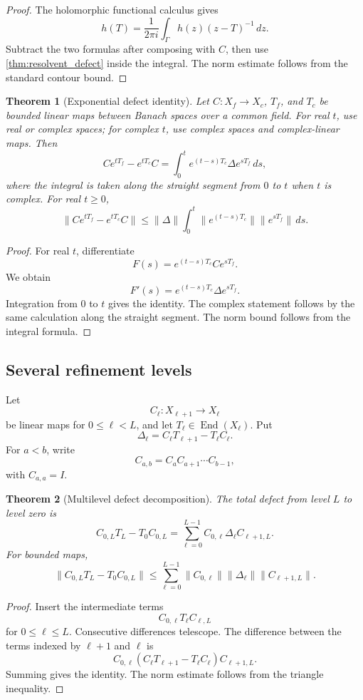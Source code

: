 \documentclass[11pt,a4paper]{article}
\newtheorem{theorem}{Theorem}[section]
\theoremstyle{definition}
\theoremstyle{remark}
\newcommand{\End}{\operatorname{End}}
\providecommand{\End}{\operatorname{End}}
\theoremstyle{definition}\newtheorem{construction}[theorem]{Construction}\newtheorem{certificate}[theorem]{Numerical Certificate}
\theoremstyle{remark}\newtheorem{boundary}[theorem]{Boundary}
\begin{document}
\begin{proof}
The holomorphic functional calculus gives
\[
h(T)
=
\frac{1}{2\pi i}
\int_\Gamma h(z)(z-T)^{-1}\,dz.
\]
Subtract the two formulas after composing with $C$, then use \cref{thm:resolvent_defect} inside the integral.  The norm estimate follows from the standard contour bound.
\end{proof}

\begin{theorem}[Exponential defect identity]\label{thm:exponential_defect}
Let $C:X_f\to X_c$, $T_f$, and $T_c$ be bounded linear maps between Banach spaces over a common field.  For real $t$, use real or complex spaces; for complex $t$, use complex spaces and complex-linear maps.  Then
\[
Ce^{tT_f}-e^{tT_c}C
=
\int_0^t e^{(t-s)T_c}\Delta e^{sT_f}\,ds,
\]
where the integral is taken along the straight segment from $0$ to $t$ when $t$ is complex.  For real $t\geq0$,
\[
\|Ce^{tT_f}-e^{tT_c}C\|
\leq
\|\Delta\|
\int_0^t
\|e^{(t-s)T_c}\|
\|e^{sT_f}\|\,ds.
\]
\end{theorem}

\begin{proof}
For real $t$, differentiate
\[
F(s)=e^{(t-s)T_c}Ce^{sT_f}.
\]
We obtain
\[
F'(s)=e^{(t-s)T_c}\Delta e^{sT_f}.
\]
Integration from $0$ to $t$ gives the identity.  The complex statement follows by the same calculation along the straight segment.  The norm bound follows from the integral formula.
\end{proof}

\subsection{Several refinement levels}

Let
\[
C_\ell:X_{\ell+1}\longrightarrow X_\ell
\]
be linear maps for $0\leq\ell<L$, and let $T_\ell\in\End(X_\ell)$.  Put
\[
\Delta_\ell=C_\ell T_{\ell+1}-T_\ell C_\ell.
\]
For $a<b$, write
\[
C_{a,b}=C_aC_{a+1}\cdots C_{b-1},
\]
with $C_{a,a}=I$.

\begin{theorem}[Multilevel defect decomposition]\label{thm:multilevel_defect}
The total defect from level $L$ to level zero is
\[
C_{0,L}T_L-T_0C_{0,L}
=
\sum_{\ell=0}^{L-1}
C_{0,\ell}\Delta_\ell C_{\ell+1,L}.
\]
For bounded maps,
\[
\|C_{0,L}T_L-T_0C_{0,L}\|
\leq
\sum_{\ell=0}^{L-1}
\|C_{0,\ell}\|
\|\Delta_\ell\|
\|C_{\ell+1,L}\|.
\]
\end{theorem}

\begin{proof}
Insert the intermediate terms
\[
C_{0,\ell}T_\ell C_{\ell,L}
\]
for $0\leq\ell\leq L$.  Consecutive differences telescope.  The difference between the terms indexed by $\ell+1$ and $\ell$ is
\[
C_{0,\ell}(C_\ell T_{\ell+1}-T_\ell C_\ell)C_{\ell+1,L}.
\]
Summing gives the identity.  The norm estimate follows from the triangle inequality.
\end{proof}
\end{document}
